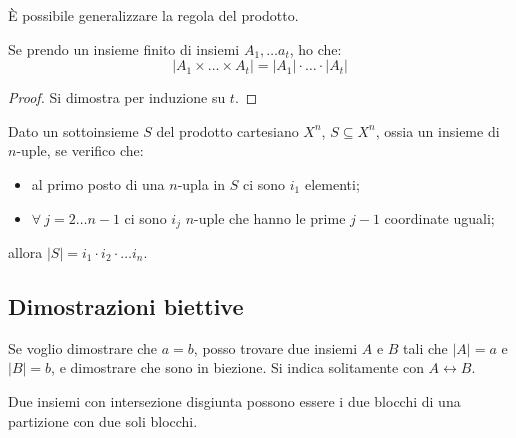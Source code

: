\`E possibile generalizzare la regola del prodotto.
\begin{prop}
Se prendo un insieme finito di insiemi $A_1, \dots a_t$, ho che:
\[
\left| A_1 \times \dots \times A_t \right| = |A_1| \cdot \ldots \cdot |A_t|
\]
\end{prop}
\begin{proof}
Si dimostra per induzione su $t$.
\end{proof}

\begin{defn}
Dato un sottoinsieme $S$ del prodotto cartesiano $X^n$, $S \subseteq X^n$, ossia un insieme di $n$-uple, se verifico che:
\begin{itemize}
  \item al primo posto di una $n$-upla in $S$ ci sono $i_1$ elementi;
  \item $\forall \ j = 2 \dots n-1$ ci sono $i_j$ $n$-uple che hanno le prime $j-1$ coordinate uguali;
\end{itemize}
allora $|S| = i_1 \cdot i_2 \cdot \dots i_n$.
\end{defn}

\subsection{Dimostrazioni biettive}

Se voglio dimostrare che $a = b$, posso trovare due insiemi $A$ e $B$ tali che $|A| = a$ e $|B| = b$, e dimostrare che sono in biezione. Si indica solitamente con $A \leftrightarrow B$.

Due insiemi con intersezione disgiunta possono essere i due blocchi di una partizione con due soli blocchi.


